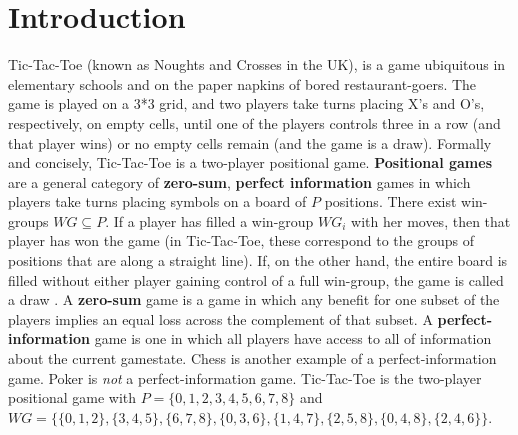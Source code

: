 \documentclass[12pt,a4paper]{article}
\begin{document}
\section{Introduction}
Tic-Tac-Toe (known as Noughts and Crosses in the UK), is a game ubiquitous in elementary schools and on the paper napkins of bored restaurant-goers. The game is played on a 3*3 grid, and two players take turns placing X's and O's, respectively, on empty cells, until one of the players controls three in a row (and that player wins) or no empty cells remain (and the game is a draw).
Formally and concisely, Tic-Tac-Toe is a two-player positional game. \textbf{Positional games} are a general category of \textbf{zero-sum}, \textbf{perfect information} games in which players take turns placing symbols on a board of $P$ positions. There exist win-groups $WG \subseteq P$. If a player has filled a win-group $WG_i$ with her moves, then that player has won the game (in Tic-Tac-Toe, these correspond to the groups of positions that are along a straight line). If, on the other hand, the entire board is filled without either player gaining control of a full win-group, the game is called a draw \cite{hefetz2014positional}. A \textbf{zero-sum} game is a game in which any benefit for one subset of the players implies an equal loss across the complement of that subset. A \textbf{perfect-information} game is one in which all players have access to all of information about the current gamestate. Chess is another example of a perfect-information game. Poker is \textit{not} a perfect-information game.
Tic-Tac-Toe is the two-player positional game with $P = \{0,1,2,3,4,5,6,7,8\}$ and $WG = \{\{0,1,2\}, \{3,4,5\},\{6,7,8\}, \{0,3,6\}, \{1,4,7\}, \{2,5,8\}, \{0,4,8\}, \{2,4,6\}\}$. 
\end{document}
